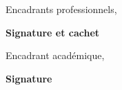 \thispagestyle{empty}

\begin{center}
    \begin{minipage}[l]{1\columnwidth}
        \begin{tcolorbox}[colback=white,boxrule=5pt,arc=10pt,height=105mm]{
            \vspace{2cm}
            \large \@proSignSentence
            \vspace{1mm}
            \begin{center}
                \Large
                Encadrants professionnels, \textbf{\@proFramerName}
            \end{center}
            \vspace{5mm}
            \hspace{0.71\columnwidth}\textbf{\large Signature et cachet}
        }
        \end{tcolorbox}
    \end{minipage}
    
    \vspace{2cm}
    
    \begin{minipage}[l]{1\columnwidth}
        \begin{tcolorbox}[colback=white,boxrule=5pt,arc=10pt,height=105mm]{
            \vspace{2cm}
            \large \@academicSignSentence
            \vspace{1mm}
            \begin{center}
                \Large
                Encadrant académique, \textbf{\@academicFramerName}
            \end{center}
            \vspace{5mm}
            \hspace{0.84\columnwidth}\textbf{\large Signature}
        }
        \end{tcolorbox}
    \end{minipage}
\end{center}
